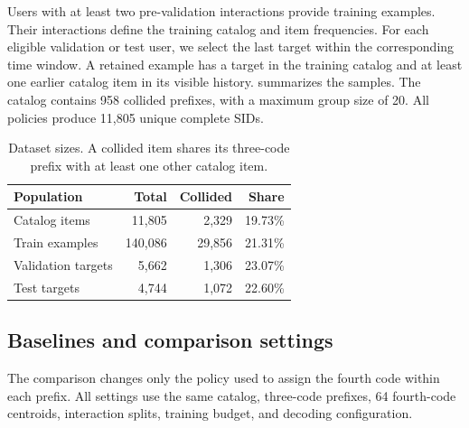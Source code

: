 \documentclass[10pt,twocolumn,letterpaper]{article}
\begin{document}
Users with at least two pre-validation interactions provide training examples.
Their interactions define the training catalog and item frequencies.
For each eligible validation or test user, we select the last target within the corresponding time window.
A retained example has a target in the training catalog and at least one earlier catalog item in its visible history.
 summarizes the samples.
The catalog contains 958 collided prefixes, with a maximum group size of 20.
All policies produce 11,805 unique complete SIDs.

\begin{table}[t]
    \centering
    \small
    \begin{tabular}{lrrr}
        \toprule
        Population & Total & Collided & Share \\
        \midrule
        Catalog items     & 11,805  & 2,329  & 19.73\% \\
        Train examples    & 140,086 & 29,856 & 21.31\% \\
        Validation targets & 5,662  & 1,306  & 23.07\% \\
        Test targets       & 4,744  & 1,072  & 22.60\% \\
        \bottomrule
    \end{tabular}
    \caption{Dataset sizes. A collided item shares its three-code prefix with at least one other catalog item.}
    \label{tab:data}
\end{table}

\subsection{Baselines and comparison settings}
\label{sec:baselines}
The comparison changes only the policy used to assign the fourth code within each prefix.
All settings use the same catalog, three-code prefixes, 64 fourth-code centroids, interaction splits, training budget, and decoding configuration.
\end{document}
